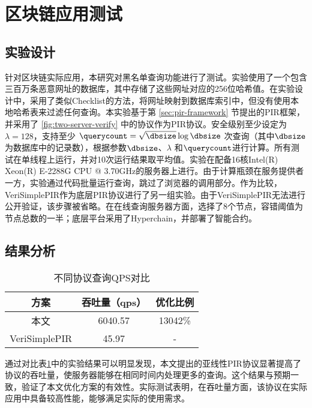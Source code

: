 \section{区块链应用测试}
\subsection{实验设计}
针对区块链实际应用，本研究对黑名单查询功能进行了测试。实验使用了一个包含三百万条恶意网址的数据库，其中存储了这些网址对应的256位哈希值。在实验设计中，采用了类似Checklist\cite{USENIX:KogCor21}的方法，将网址映射到数据库索引中，但没有使用本地哈希表来过滤任何查询。本实验基于第 \ref{sec:pir-framework} 节提出的PIR框架，并采用了 \ref{fig:two-server-verify} 中的协议作为PIR协议。安全级别至少设定为 $\lambda=128$，支持至少 $\querycount=\sqrt{\dbsize}\log{\dbsize}$ 次查询（其中$\dbsize$为数据库中的记录数），根据参数$\dbsize$、$\lambda$ 和$\querycount$进行计算。所有测试在单线程上运行，并对10次运行结果取平均值。实验在配备16核Intel(R) Xeon(R) E-2288G CPU @ 3.70GHz的服务器上进行。由于计算瓶颈在服务提供者一方，实验通过代码批量运行查询，跳过了浏览器的调用部分。作为比较，VeriSimplePIR\cite{VeriSimplePIR}作为底层PIR协议进行了另一组实验。由于VeriSimplePIR无法进行公开验证，该步骤被省略。在在线查询服务器方面，选择了8个节点，容错阈值为节点总数的一半；底层平台采用了Hyperchain\cite{hyperchain}，并部署了智能合约。

\subsection{结果分析}

\begin{table}[]
    \caption{不同协议查询QPS对比}
    \centering
    \label{tab:blockchain-query-qps}
    \begin{tabular}{@{}c|c|c@{}}
    \toprule
    方案            & 吞吐量（qps） & 优化比例    \\ \midrule
    本文            & 6040.57  & 13042\% \\
    VeriSimplePIR & 45.97    & -       \\ \bottomrule
    \end{tabular}
\end{table}

通过对比表\ref{tab:blockchain-query-qps}中的实验结果可以明显发现，本文提出的亚线性PIR协议显著提高了协议的吞吐量，使服务器能够在相同时间内处理更多的查询。这个结果与预期一致，验证了本文优化方案的有效性。实际测试表明，在吞吐量方面，该协议在实际应用中具备较高性能，能够满足实际的使用需求。

